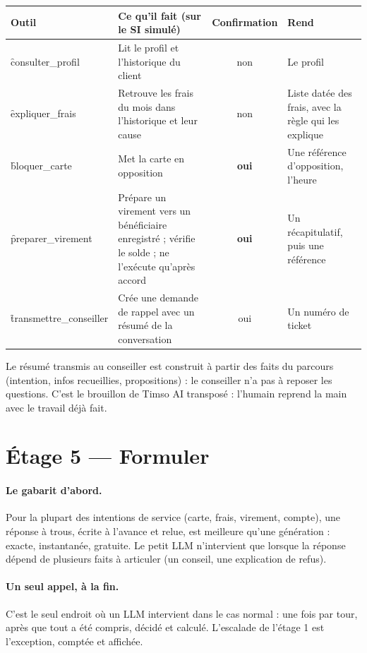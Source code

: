 \begin{center}\small
\begin{tabularx}{\textwidth}{@{}l Y c Y@{}}
\toprule
\textbf{Outil} & \textbf{Ce qu'il fait (sur le SI simulé)} & \textbf{Confirmation} &
  \textbf{Rend} \\
\midrule
\f{consulter\_profil} & Lit le profil et l'historique du client & non & Le profil \\
\f{expliquer\_frais} & Retrouve les frais du mois dans l'historique et leur cause & non & Liste
  datée des frais, avec la règle qui les explique \\
\f{bloquer\_carte} & Met la carte en opposition & \textbf{oui} & Une référence d'opposition,
  l'heure \\
\f{preparer\_virement} & Prépare un virement vers un bénéficiaire enregistré ; vérifie le solde ;
  ne l'exécute qu'après accord & \textbf{oui} & Un récapitulatif, puis une référence \\
\f{transmettre\_conseiller} & Crée une demande de rappel avec un résumé de la conversation & oui &
  Un numéro de ticket \\
\bottomrule
\end{tabularx}
\end{center}

Le résumé transmis au conseiller est construit à partir des faits du parcours (intention, infos
recueillies, propositions) : le conseiller n'a pas à reposer les questions. C'est le
\og brouillon \fg{} de Timso AI transposé : l'humain reprend la main avec le travail déjà fait.

\section{Étage 5 --- Formuler}

\paragraph{Le gabarit d'abord.} Pour la plupart des intentions de service (carte, frais, virement,
compte), une réponse à trous, écrite à l'avance et relue, est meilleure qu'une génération : exacte,
instantanée, gratuite. Le petit LLM n'intervient que lorsque la réponse dépend de plusieurs faits à
articuler (un conseil, une explication de refus).

\paragraph{Un seul appel, à la fin.} C'est le seul endroit où un LLM intervient dans le cas
normal : une fois par tour, après que tout a été compris, décidé et calculé. L'escalade de
l'étage 1 est l'exception, comptée et affichée.

